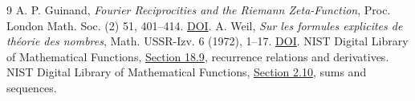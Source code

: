 \documentclass[11pt]{article}
\begin{document}
\begin{thebibliography}{9}
 A. P. Guinand, \emph{Fourier Reciprocities and the Riemann Zeta-Function}, Proc. London Math. Soc. (2) 51, 401--414. \href{https://doi.org/10.1112/plms/s2-51.6.401}{DOI}.
 A. Weil, \emph{Sur les formules explicites de th\'eorie des nombres}, Math. USSR-Izv. 6 (1972), 1--17. \href{https://doi.org/10.1070/IM1972v006n01ABEH001866}{DOI}.
 NIST Digital Library of Mathematical Functions, \href{https://dlmf.nist.gov/18.9}{Section 18.9}, recurrence relations and derivatives.
 NIST Digital Library of Mathematical Functions, \href{https://dlmf.nist.gov/2.10}{Section 2.10}, sums and sequences.
\end{thebibliography}
\end{document}
